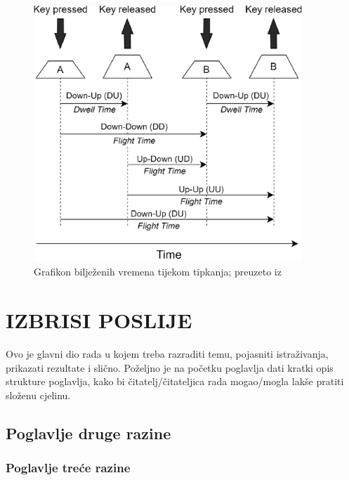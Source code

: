 \documentclass[]{foi}
\begin{document}
\begin{figure}[]
    \centering
    \includegraphics[width=0.9\textwidth]{slike/tipkanje-graf.jpg}
    \caption{Grafikon bilježenih vremena tijekom tipkanja; preuzeto iz \cite{Dias2023}}
    \label{fig:graf-vremena-tipkanja}
\end{figure}







\chapter{IZBRISI POSLIJE}

Ovo je glavni dio rada u kojem treba razraditi temu, pojasniti istraživanja, prikazati rezultate i slično. Poželjno je na početku poglavlja dati kratki opis strukture poglavlja, kako bi čitatelj/čitateljica rada mogao/mogla lakše pratiti složenu cjelinu.



\section{Poglavlje druge razine }

\lipsum[6]



\subsection{Poglavlje treće razine}
\end{document}
